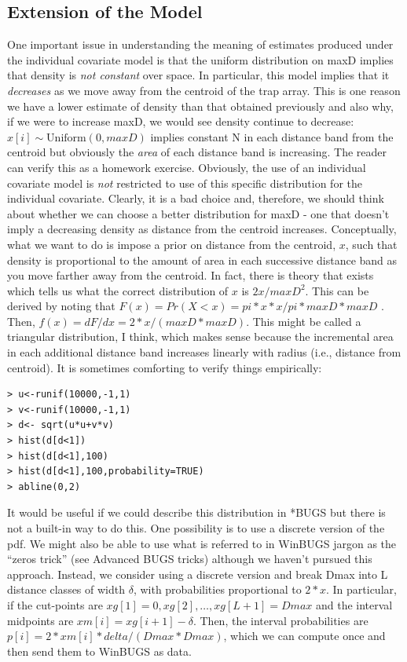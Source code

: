 \subsection{Extension of the Model}
One important issue in understanding the meaning of estimates produced under the individual covariate model  is that the uniform distribution on maxD implies that density is {\it not constant} over space. In particular, this model implies that it {\it decreases} as we move away from the centroid of the trap array. This is one reason we have a lower estimate of density than that obtained previously and also why, if we were to increase maxD, we would see density continue to decrease: $x[i] \sim \mbox{Uniform}(0,maxD)$ implies constant N in each distance band from the centroid but obviously the {\it area} of each distance band is increasing.  The reader can verify this as a homework exercise.
Obviously, the use of an individual covariate model is {\it not} restricted to use of this specific distribution for the individual covariate. Clearly, it is a bad choice and, therefore,  we should think about whether we can choose a better distribution for maxD - one that doesn't imply a decreasing density as distance from the centroid increases.  Conceptually, what we want to do is impose a prior on distance from the centroid, $x$, such that density is proportional to the amount of area in each successive distance band as you move farther away from the centroid.  In fact, there is theory that exists which tells us what the correct distribution of $x$ is $2x/maxD^2$. This can be derived by noting that $F(x) = Pr(X<x) = pi*x*x/pi*maxD*maxD$ . Then, $f(x) = dF/dx = 2*x/(maxD*maxD)$.  This might be called a triangular distribution, I think, which makes sense because the incremental area in each additional distance band increases linearly with radius (i.e., distance from centroid). It is sometimes comforting to verify things empirically:
\begin{verbatim}
> u<-runif(10000,-1,1)
> v<-runif(10000,-1,1)
> d<- sqrt(u*u+v*v)
> hist(d[d<1])
> hist(d[d<1],100)
> hist(d[d<1],100,probability=TRUE)
> abline(0,2)
\end{verbatim}

It would be useful if we could describe this distribution in *BUGS but there is not a built-in way to do this.  One possibility is to use a discrete version of the pdf. We might also be able to use what is referred to in WinBUGS jargon as the ``zeros trick'' (see Advanced BUGS tricks) although we haven't pursued this approach. Instead, we consider using a discrete version and break Dmax into L distance classes of width $\delta$, with probabilities proportional to $2*x$. In particular, if the cut-points are $xg[1]=0,xg[2], \ldots, xg[L+1]=Dmax$ and the interval midpoints are $xm[i] = xg[i+1]-\delta$. Then, the interval probabilities are $p[i] = 2*xm[i]*delta/(Dmax*Dmax)$, which we can compute once and then send them to WinBUGS as data.

